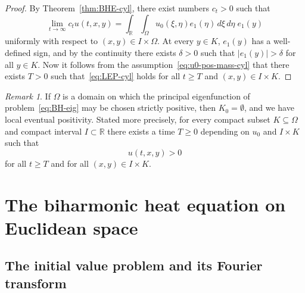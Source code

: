\documentclass[a4paper, reqno]{amsart}
\numberwithin{equation}{section}
\theoremstyle{plain}
\theoremstyle{definition}
\theoremstyle{remark}
\newtheorem{remark}[theorem]{Remark}
\newcommand{\RR}{\mathbb{R}}
\begin{document}
\begin{proof}
  By Theorem~\ref{thm:BHE-cyl}, there exist numbers $c_t > 0$ such that
  \begin{displaymath}
    \lim_{t \to \infty} c_t u(t,x,y) = \int_\RR \int_\Omega u_0(\xi, \eta) e_1(\eta) \,d\xi \,d\eta \; e_1(y)
  \end{displaymath}
  uniformly with respect to $(x,y) \in I \times \Omega$. At every $y \in K$, $e_1(y)$ has a well-defined sign, and by the continuity there exists $\delta>0$ such that $|e_1(y)|>\delta$ for all $y\in K$. Now it follows from the assumption~\eqref{eq:u0-pos-mass-cyl} that there exists $T>0$ such that~\eqref{eq:LEP-cyl} holds for all $t\geq T$ and $(x,y)\in I \times K$.
\end{proof}

\begin{remark}
  If $\Omega$ is a domain on which the principal eigenfunction of problem~\eqref{eq:BH-eig} may be chosen strictly positive, then $K_0 = \emptyset$, and we have local eventual positivity. Stated more precisely, for every compact subset $K \subseteq \Omega$ and compact interval $I \subset \RR$ there exists a time $T \geq 0$ depending on $u_0$ and $I \times K$ such that
  \begin{equation*}
    u(t,x,y) > 0
  \end{equation*}
  for all $t \geq T$ and for all $(x,y) \in I \times K$.
\end{remark}

\section{The biharmonic heat equation on Euclidean space}
\label{sec:BHE-Rn}

\subsection{The initial value problem and its Fourier transform}
\end{document}
